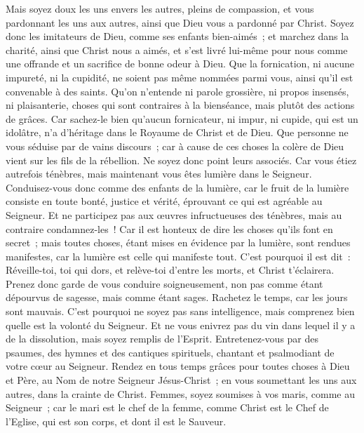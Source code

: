 \begin{multicols}{2}
Mais soyez doux les uns envers les autres, pleins de compassion, et vous pardonnant les uns aux autres, ainsi que Dieu vous a pardonné par Christ.
\VerseOne{}Soyez donc les imitateurs de Dieu, comme ses enfants bien-aimés~;
et marchez dans la charité, ainsi que Christ nous a aimés, et s'est livré lui-même pour nous comme une offrande et un sacrifice de bonne odeur à Dieu.
Que la fornication, ni aucune impureté, ni la cupidité, ne soient pas même nommées parmi vous, ainsi qu'il est convenable à des saints.
Qu'on n'entende ni parole grossière, ni propos insensés, ni plaisanterie, choses qui sont contraires à la bienséance, mais plutôt des actions de grâces.
Car sachez-le bien qu'aucun fornicateur, ni impur, ni cupide, qui est un idolâtre, n'a d'héritage dans le Royaume de Christ et de Dieu.
Que personne ne vous séduise par de vains discours~; car à cause de ces choses la colère de Dieu vient sur les fils de la rébellion.
Ne soyez donc point leurs associés.
Car vous étiez autrefois ténèbres, mais maintenant vous êtes lumière dans le Seigneur. Conduisez-vous donc comme des enfants de la lumière,
car le fruit de la lumière consiste en toute bonté, justice et vérité,
éprouvant ce qui est agréable au Seigneur.
Et ne participez pas aux œuvres infructueuses des ténèbres, mais au contraire condamnez-les~!
Car il est honteux de dire les choses qu'ils font en secret~;
mais toutes choses, étant mises en évidence par la lumière, sont rendues manifestes, car la lumière est celle qui manifeste tout.
C'est pourquoi il est dit~: Réveille-toi, toi qui dors, et relève-toi d'entre les morts, et Christ t'éclairera.
Prenez donc garde de vous conduire soigneusement, non pas comme étant dépourvus de sagesse, mais comme étant sages.
Rachetez le temps, car les jours sont mauvais.
C'est pourquoi ne soyez pas sans intelligence, mais comprenez bien quelle est la volonté du Seigneur.
Et ne vous enivrez pas du vin dans lequel il y a de la dissolution, mais soyez remplis de l'Esprit.
Entretenez-vous par des psaumes, des hymnes et des cantiques spirituels, chantant et psalmodiant de votre cœur au Seigneur.
Rendez en tous temps grâces pour toutes choses à Dieu et Père, au Nom de notre Seigneur Jésus-Christ~;
en vous soumettant les uns aux autres, dans la crainte de Christ.
Femmes, soyez soumises à vos maris, comme au Seigneur~;
car le mari est le chef de la femme, comme Christ est le Chef de l'Eglise, qui est son corps, et dont il est le Sauveur.

\end{multicols}
